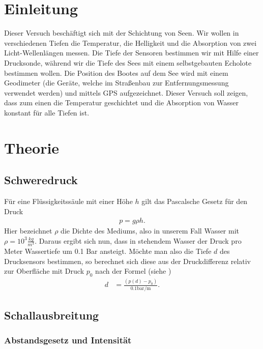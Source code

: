 \documentclass[12pt,a4paper,titlepage,headinclude,bibtotoc]{scrartcl}
\begin{document}
\section{Einleitung}
\label{sec:einleitung}
\cite{demtroeder}
Dieser Versuch beschäftigt sich mit der Schichtung von Seen.
Wir wollen in verschiedenen Tiefen die Temperatur, die Helligkeit und die Absorption von zwei Licht-Wellenlängen messen.
Die Tiefe der Sensoren bestimmen wir mit Hilfe einer Drucksonde, während wir die Tiefe des Sees mit einem selbstgebauten Echolote bestimmen wollen.
Die Position des Bootes auf dem See wird mit einem Geodimeter (die Geräte, welche im Straßenbau zur Entfernungsmessung verwendet werden) und mittels GPS aufgezeichnet.
Dieser Versuch soll zeigen, dass zum einen die Temperatur geschichtet und die Absorption von Wasser konstant für alle Tiefen ist.


\section{Theorie}
\label{sec:theorie}
\subsection{Schweredruck}

Für eine Flüssigkeitssäule mit einer Höhe $h$ gilt das Pascalsche Gesetz für den Druck
\begin{align}
 p= g \rho h.
\end{align}
Hier bezeichnet $\rho$ die Dichte des Mediums, also in unserem Fall Wasser mit $\rho = 10^3 \frac{kg}{m^3}$. Daraus ergibt sich nun, dass in stehendem Wasser der Druck pro Meter Wassertiefe um 0.1 Bar ansteigt.
Möchte man also die Tiefe $d$ des Drucksensors bestimmen, so berechnet sich diese aus der Druckdifferenz relativ zur Oberfläche mit Druck $p_0$ nach der Formel (siehe \cite[S.118]{gerthsen})
\begin{align}
	d&=\frac{(p(d)-p_0)}{0.1\si{\bar \per\metre}}. \label{eq:d}
\end{align}


\subsection{Schallausbreitung}

\subsubsection{Abstandsgesetz und Intensität}
\end{document}
